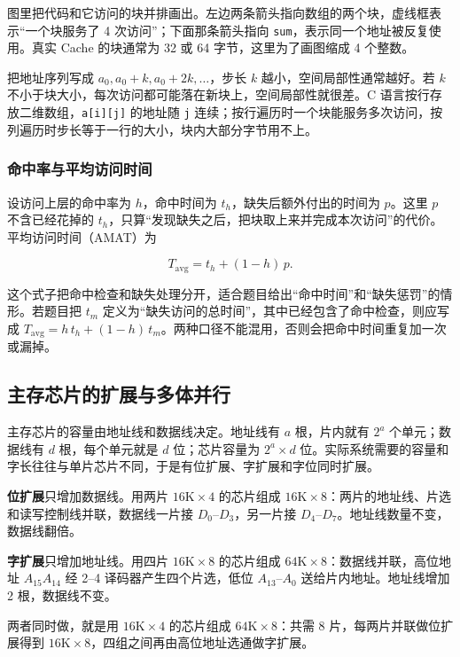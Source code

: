 图里把代码和它访问的块并排画出。左边两条箭头指向数组的两个块，虚线框表示“一个块服务了 4 次访问”；下面那条箭头指向 \texttt{sum}，表示同一个地址被反复使用。真实 Cache 的块通常为 32 或 64 字节，这里为了画图缩成 4 个整数。

把地址序列写成 \(a_0, a_0+k, a_0+2k,\dots\)，步长 \(k\) 越小，空间局部性通常越好。若 \(k\) 不小于块大小，每次访问都可能落在新块上，空间局部性就很差。C 语言按行存放二维数组，\texttt{a[i][j]} 的地址随 \texttt{j} 连续；按行遍历时一个块能服务多次访问，按列遍历时步长等于一行的大小，块内大部分字节用不上。

\subsubsection*{命中率与平均访问时间}

设访问上层的命中率为 \(h\)，命中时间为 \(t_h\)，缺失后额外付出的时间为 \(p\)。这里 \(p\) 不含已经花掉的 \(t_h\)，只算“发现缺失之后，把块取上来并完成本次访问”的代价。平均访问时间（AMAT）为

\[
T_{\mathrm{avg}} = t_h + (1-h)\,p .
\]

这个式子把命中检查和缺失处理分开，适合题目给出“命中时间”和“缺失惩罚”的情形。若题目把 \(t_m\) 定义为“缺失访问的总时间”，其中已经包含了命中检查，则应写成 \(T_{\mathrm{avg}}=h\,t_h+(1-h)\,t_m\)。两种口径不能混用，否则会把命中时间重复加一次或漏掉。

\subsection{主存芯片的扩展与多体并行}

主存芯片的容量由地址线和数据线决定。地址线有 \(a\) 根，片内就有 \(2^a\) 个单元；数据线有 \(d\) 根，每个单元就是 \(d\) 位；芯片容量为 \(2^a\times d\) 位。实际系统需要的容量和字长往往与单片芯片不同，于是有位扩展、字扩展和字位同时扩展。

\textbf{位扩展}只增加数据线。用两片 \(16\mathrm{K}\times4\) 的芯片组成 \(16\mathrm{K}\times8\)：两片的地址线、片选和读写控制线并联，数据线一片接 \(D_0\)--\(D_3\)，另一片接 \(D_4\)--\(D_7\)。地址线数量不变，数据线翻倍。

\textbf{字扩展}只增加地址线。用四片 \(16\mathrm{K}\times8\) 的芯片组成 \(64\mathrm{K}\times8\)：数据线并联，高位地址 \(A_{15}A_{14}\) 经 2--4 译码器产生四个片选，低位 \(A_{13}\)--\(A_0\) 送给片内地址。地址线增加 2 根，数据线不变。

两者同时做，就是用 \(16\mathrm{K}\times4\) 的芯片组成 \(64\mathrm{K}\times8\)：共需 8 片，每两片并联做位扩展得到 \(16\mathrm{K}\times8\)，四组之间再由高位地址选通做字扩展。

